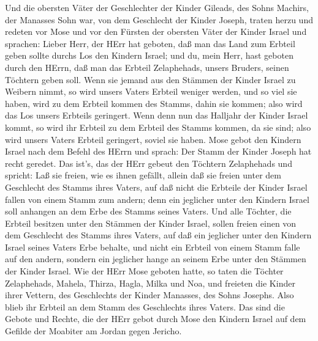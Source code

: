  Und die obersten Väter der Geschlechter der Kinder Gileads,
des Sohns Machirs, der Manasses Sohn war, von dem Geschlecht der Kinder
Joseph, traten herzu und redeten vor Mose und vor den Fürsten der
obersten Väter der Kinder Israel  und sprachen: Lieber Herr,
der HErr hat geboten, daß man das Land zum Erbteil geben sollte durchs
Los den Kindern Israel; und du, mein Herr, hast geboten durch den HErrn,
daß man das Erbteil Zelaphehads, unsers Bruders, seinen Töchtern geben
soll.  Wenn sie jemand aus den Stämmen der Kinder Israel zu
Weibern nimmt, so wird unsers Vaters Erbteil weniger werden, und so viel
sie haben, wird zu dem Erbteil kommen des Stamms, dahin sie kommen; also
wird das Los unsers Erbteils geringert.  Wenn denn nun das
Halljahr der Kinder Israel kommt, so wird ihr Erbteil zu dem Erbteil des
Stamms kommen, da sie sind; also wird unsers Vaters Erbteil geringert,
soviel sie haben.  Mose gebot den Kindern Israel nach dem
Befehl des HErrn und sprach: Der Stamm der Kinder Joseph hat recht
geredet.  Das ist's, das der HErr gebeut den Töchtern
Zelaphehads und spricht: Laß sie freien, wie es ihnen gefällt, allein
daß sie freien unter dem Geschlecht des Stamms ihres Vaters,
 auf daß nicht die Erbteile der Kinder Israel fallen von
einem Stamm zum andern; denn ein jeglicher unter den Kindern Israel soll
anhangen an dem Erbe des Stamms seines Vaters.  Und alle
Töchter, die Erbteil besitzen unter den Stämmen der Kinder Israel,
sollen freien einen von dem Geschlecht des Stamms ihres Vaters, auf daß
ein jeglicher unter den Kindern Israel seines Vaters Erbe behalte,
 und nicht ein Erbteil von einem Stamm falle auf den andern,
sondern ein jeglicher hange an seinem Erbe unter den Stämmen der Kinder
Israel.  Wie der HErr Mose geboten hatte, so taten die
Töchter Zelaphehads,  Mahela, Thirza, Hagla, Milka und Noa,
und freieten die Kinder ihrer Vettern,  des Geschlechts der
Kinder Manasses, des Sohns Josephs. Also blieb ihr Erbteil an dem Stamm
des Geschlechts ihres Vaters.  Das sind die Gebote und
Rechte, die der HErr gebot durch Mose den Kindern Israel auf dem Gefilde
der Moabiter am Jordan gegen Jericho.
